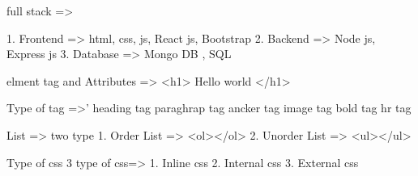 full stack => 

1. Frontend => html, css, js, React js, Bootstrap
2. Backend => Node js, Express js
3. Database => Mongo DB , SQL


elment tag and Attributes =>
<h1> Hello world </h1>

Type of  tag =>'
heading tag
paraghrap tag
ancker tag
image tag
bold tag
hr tag

List => two type 
1. Order List  => <ol></ol>
2. Unorder List => <ul></ul>


Type of css
3 type of css=>
1. Inline css
2. Internal css
3. External css